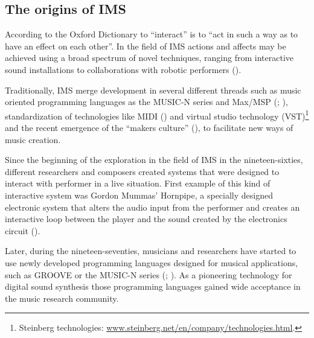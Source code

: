 \documentclass[a4paper,11pt]{article}
\begin{document}
\subsection{The origins of IMS}

According to the Oxford Dictionary to ``interact'' is to ``act in such a way as to have an effect on each other''.
In the field of IMS actions and affects may be achieved using a broad spectrum of novel techniques, ranging from interactive sound installations to collaborations with robotic performers (\cite{drummond09}).

Traditionally, IMS merge development in several different threads such as music oriented programming languages as the MUSIC-N series and Max/MSP (\cite{mathews69}; \cite[p. 16]{winkler01}), standardization of technologies like MIDI (\cite{web:quinn}) and virtual studio technology (VST)\footnote{Steinberg technologies: \href{http://www.steinberg.net/en/company/technologies.html}{www.steinberg.net/en/company/technologies.html}.} and the recent emergence of the ``makers culture'' (\cite{kuznetsov2010rise}), to facilitate new ways of music creation.

Since the beginning of the exploration in the field of IMS in the nineteen-sixties, different researchers and composers created systems that were designed to interact with performer in a live situation.
First example of this kind of interactive system was Gordon Mummas' Hornpipe, a specially designed electronic system that alters the audio input from the performer and creates an interactive loop between the player and the sound created by the electronics circuit (\cite[p. 12]{winkler01}).

Later, during the nineteen-seventies, musicians and researchers have started to use newly developed programming languages designed for musical applications, such as GROOVE or the MUSIC-N series (\cite{mathews70}; \cite{mathews69}).
As a pioneering technology for digital sound synthesis those programming languages gained wide acceptance in the music research community.
\end{document}
